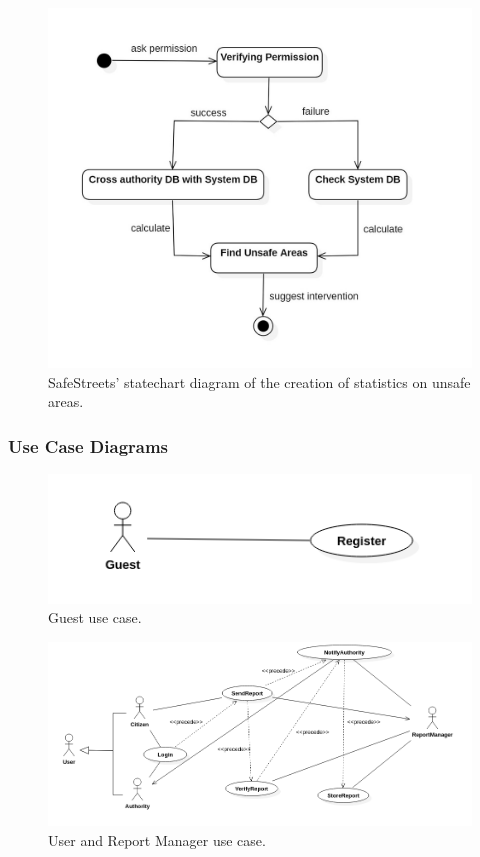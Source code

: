 \documentclass{report}
\begin{document}
\begin{figure}[h!]
\begin{center}
\includegraphics[scale=0.4]{./img/img_UnsafeAreas.jpg}
\end{center}
\caption{SafeStreets' statechart diagram of the creation of statistics on unsafe areas.}
\label{schema}
\end{figure}
\newpage
\subsubsection{Use Case Diagrams}

\begin{figure}[ht!]
\begin{center}
\includegraphics[scale=0.4]{./img/UseCase1.png}
\end{center}
\caption{Guest use case.}
\label{schema}
\end{figure}

\begin{figure}[ht!]
\begin{center}
\includegraphics[scale=0.4]{./img/UseCase2.png}
\end{center}
\caption{User and Report Manager use case.}
\label{schema}
\end{figure}
\end{document}
